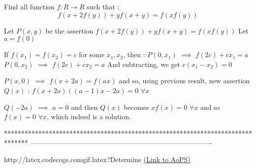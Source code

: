 \begin{solution}
	\begin{tcolorbox}Find all function $f:R\rightarrow R$  such that : 
                                                                              \[f(x+2f(y))+yf(x+y)=f(xf(y))\]\end{tcolorbox}
Let $P(x,y)$ be the assertion $f(x+2f(y))+yf(x+y)=f(xf(y))$
Let $a=f(0)$

If $f(x_1)=f(x_2)=c$ for some $x_1,x_2$, then :
$P(0,x_1)$ $\implies$ $f(2c)+cx_1=a$
$P(0,x_2)$ $\implies$ $f(2c)+cx_2=a$
And subtracting, we get $c(x_1-x_2)=0$

$P(x,0)$ $\implies$ $f(x+2a)=f(ax)$ and so, using previous result, new assertion $Q(x)$ : $f(x+2a)((a-1)x-2a)=0$ $\forall x$

$Q(-2a)$ $\implies$ $a=0$ and then $Q(x)$ becomes $xf(x)=0$ $\forall x$ and so $\boxed{f(x)=0}$ $\forall x$, which indeed is a solution.
\end{solution}
*******************************************************************************
-------------------------------------------------------------------------------

\begin{problem}http://latex.codecogs.com\/gif.latex?Determine%
	\flushright \href{https://artofproblemsolving.com/community/c6h617495}{(Link to AoPS)}
\end{problem}



